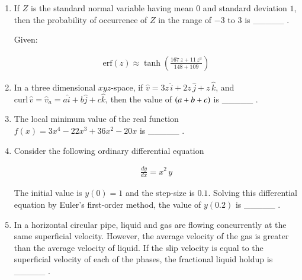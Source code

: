 \documentclass[journal,12pt,onecolumn]{IEEEtran}
\theoremstyle{remark}
\begin{document}
\begin{enumerate}
\hfill{}


\item If $Z$ is the standard normal variable having mean $0$ and standard deviation $1$, then the probability of occurrence of $Z$ in the range of $-3$ to $3$ is \_\_\_\_\_ .

Given: 

\begin{align*}
\mathrm{erf}(z) \approx \tanh\!\left(\frac{167\,z + 11\,z^{3}}{148 + 109}\right)
\end{align*}

\hfill{}

\item In a three dimensional $x y z$-space, if $\hat{v} = 3z\,\hat{i} + 2z\,\hat{j} + z\,\hat{k}$, and $\mathrm{curl}\,\hat{v} = \hat{v}_{a} = a\hat{i} + b\hat{j} + c\hat{k}$, then the value of $\left(a+b+c\right)$ is \_\_\_\_\_ .

\hfill{}


\item The local minimum value of the real function $f(x) = 3x^{4} - 22x^{3} + 36x^{2} - 20x$ is \_\_\_\_\_ .

\hfill{}


\item Consider the following ordinary differential equation

\begin{align*}
\frac{dy}{dx} = x^{2}\,y
\end{align*}

The initial value is $y(0) = 1$ and the step-size is $0.1$. Solving this differential equation by Euler's first-order method, the value of $y(0.2)$ is \_\_\_\_\_ .

\hfill{}

\item In a horizontal circular pipe, liquid and gas are flowing concurrently at the same superficial velocity. However, the average velocity of the gas is greater than the average velocity of liquid. If the slip velocity is equal to the superficial velocity of each of the phases, the fractional liquid holdup is \_\_\_\_\_ .

\hfill{}


\end{enumerate}
\end{document}
